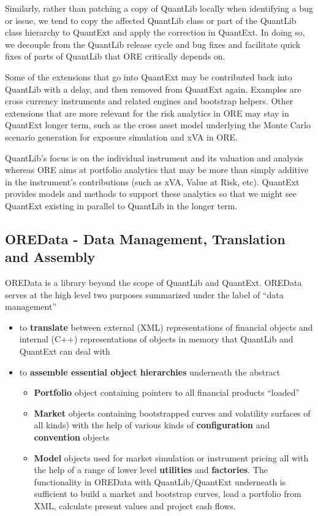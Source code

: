 \documentclass[12pt, a4paper]{report}
\begin{document}
Similarly, rather than patching a copy of QuantLib locally when identifying a bug or issue, we tend to copy the affected QuantLib class or part of the QuantLib class hierarchy to QuantExt and apply the correction in QuantExt. In doing so, we decouple
from the QuantLib release cycle and bug fixes and facilitate quick fixes of parts of QuantLib that ORE critically depends on.

Some of the extensions that go into QuantExt may be contributed back into QuantLib with a delay, and then removed from QuantExt again. Examples are cross currency instruments and related engines and bootstrap helpers. Other extensions that are more
relevant for the risk analytics in ORE may stay in QuantExt longer term, such as the cross asset model underlying the Monte Carlo scenario generation for exposure simulation and xVA in ORE.

QuantLib's focus is on the individual instrument and its valuation and analysis whereas ORE aims at portfolio analytics that may be more than simply additive in the instrument's contributions (such as xVA, Value at Risk, etc). QuantExt provides
models and methods to support these analytics so that we might see QuantExt existing in parallel to QuantLib in the longer term.

\subsection*{OREData - Data Management, Translation and Assembly}

OREData is a library beyond the scope of QuantLib and QuantExt. OREData serves at the high level two purposes summarized under the label of ``data management''
\begin{itemize}
\item to {\bf translate} between external (XML) representations of financial objects and internal (C++) representations of objects in memory that QuantLib and QuantExt can deal with
\item to {\bf assemble essential object hierarchies} underneath the abstract
\begin{itemize}
\item {\bf Portfolio} object containing pointers to all financial products ``loaded''
\item {\bf Market} objects containing bootstrapped curves and volatility surfaces of all kinds) with the help of various kinds of {\bf configuration} and {\bf convention} objects
\item {\bf Model} objects used for market simulation or instrument pricing all with the help of a range of lower level {\bf utilities} and {\bf factories}. 
The functionality in OREData with QuantLib/QuantExt underneath is sufficient to build a market and bootstrap curves, load a portfolio from XML, calculate present values and project cash flows.
\end{itemize}
\end{itemize}
\end{document}
